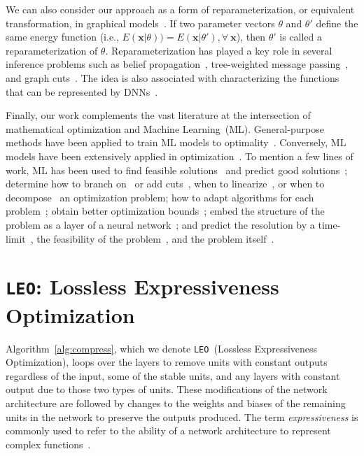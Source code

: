 \documentclass[runningheads]{llncs}
\def\vx{{\bm{x}}}
\newcommand{\dnns}{\textsc{DNN}s}
\begin{document}
        We can also consider our approach as a form of reparameterization, or equivalent transformation, in graphical models~\cite{Koval1976,Wainwright2004,Werner2005}. If two parameter vectors $\theta$ and $\theta'$ define the same energy function (i.e., $E(\vx|\theta)) = E(\vx|\theta'),\forall~\vx$), then $\theta'$ is called a  reparameterization of $\theta$. Reparameterization has played a key role in several inference problems such as belief propagation~\cite{Wainwright2004}, tree-weighted message passing~\cite{Wainwright2005}, and graph cuts~\cite{Kolmogorov2007}. The idea is also associated with characterizing the functions that can be represented by \dnns~\cite{Hornik1989,Cybenko1989,Telgarsky2016,Lin2018,arora2018understanding,FunctionApproximation,kumar2019equivalent}.
        
        Finally, our work complements the vast literature at the intersection of mathematical optimization and Machine Learning~(ML). General-purpose  methods have been applied to train ML models to optimality~\cite{ClassificationTrees,TrainingLP,BinarizedTraining,CAQL}. Conversely, ML models have been extensively applied in optimization~\cite{CombOptTour,OptimizationSurvey}. To mention a few lines of work,  ML has been used to find feasible solutions~\cite{FeasibilityCP,FeasibilityMIP} and predict good solutions~\cite{EndToEnd,KnapsackPrediction}; determine how to branch on~\cite{BranchingLearning1,BranchingLearning2,BranchingSurvey,BranchingLearning3,HeuristicTreeSearch} or add cuts~\cite{RLCut}, when to linearize~\cite{LinearizationLearning}, or when to decompose~\cite{DecompositionLearning} an optimization problem; how to adapt algorithms for each problem~\cite{AdaptBrown,AdaptUBC,AdaptPatterns,AdaptSurvey,LearnGraphAlgo,LearnTSP1,LearnTSP2}; obtain better optimization bounds~\cite{BetterBounds}; embed the structure of the problem as a layer of a neural  network~\cite{OptNet,DDGAN,agrawal2019differentiable,MIPaaL}; and  predict the resolution by a time-limit~\cite{ResolutionLearning}, the feasibility of the problem~\cite{FeasibilityPrediction}, and the 
problem itself~\cite{SPO,ModelingML,DeepInverse}. 
 
\section{\texttt{LEO}: Lossless Expressiveness Optimization}
    Algorithm~\ref{alg:compress}, which we denote \texttt{LEO}~(Lossless Expressiveness Optimization), 
    loops over the layers to remove units with constant outputs regardless of the input, some of the stable units, and any layers with constant output due to those two types of units. These modifications of the network architecture are followed by changes to the weights and biases of the remaining units in the network to preserve the outputs produced. The term \emph{expressiveness} is commonly used to refer to the ability of a network architecture to represent complex functions~\cite{serra2020empirical}.  
    
\end{document}
